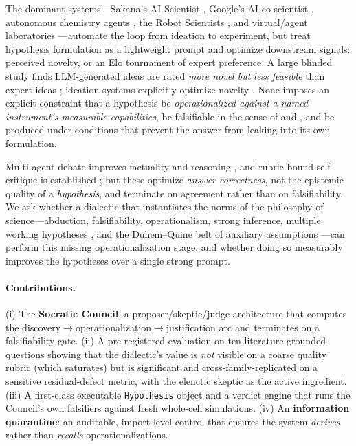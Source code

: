 \documentclass[11pt]{article}
\begin{document}
The dominant systems---Sakana's AI Scientist \citep{lu2024aiscientist,yamada2025aiscientistv2}, Google's AI
co-scientist \citep{gottweis2025coscientist}, autonomous chemistry agents \citep{boiko2023coscientist}, the
Robot Scientists \citep{king2004robotscientist,king2009automation}, and virtual/agent laboratories
\citep{swanson2024virtuallab}---automate the loop from ideation to experiment, but treat hypothesis formulation
as a lightweight prompt and optimize downstream signals: perceived novelty, or an Elo tournament of expert
preference. A large blinded study finds LLM-generated ideas are rated \emph{more novel but less feasible} than
expert ideas \citep{si2024llmideas}; ideation systems explicitly optimize novelty \citep{wang2024scimon}. None
imposes an explicit constraint that a hypothesis be \emph{operationalized against a named instrument's
measurable capabilities}, be falsifiable in the sense of \citet{popper1959logic} and \citet{platt1964strong},
and be produced under conditions that prevent the answer from leaking into its own formulation.

Multi-agent debate improves factuality and reasoning \citep{du2023debate,irving2018debate}, and rubric-bound
self-critique is established \citep{bai2022constitutional,madaan2023selfrefine,shinn2023reflexion}; but these
optimize \emph{answer correctness}, not the epistemic quality of a \emph{hypothesis}, and terminate on
agreement rather than on falsifiability. We ask whether a dialectic that instantiates the norms of the
philosophy of science---abduction, falsifiability, operationalism, strong inference, multiple working
hypotheses \citep{chamberlin1890multiple}, and the Duhem--Quine belt of auxiliary assumptions
\citep{quine1951dogmas}---can perform this missing operationalization stage, and whether doing so measurably
improves the hypotheses over a single strong prompt.

\paragraph{Contributions.} (i) The \textbf{Socratic Council}, a proposer/skeptic/judge architecture that
computes the discovery$\to$operationalization$\to$justification arc and terminates on a falsifiability gate.
(ii) A pre-registered evaluation on ten literature-grounded questions showing that the dialectic's value is
\emph{not} visible on a coarse quality rubric (which saturates) but is significant and cross-family-replicated
on a sensitive residual-defect metric, with the elenctic skeptic as the active ingredient. (iii) A first-class
executable \texttt{Hypothesis} object and a verdict engine that runs the Council's own falsifiers against fresh
whole-cell simulations. (iv) An \textbf{information quarantine}: an auditable, import-level control that ensures
the system \emph{derives} rather than \emph{recalls} operationalizations.
\end{document}
